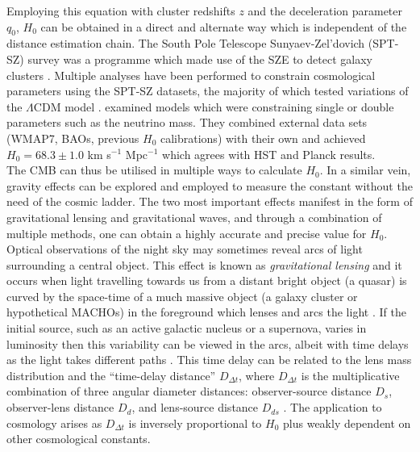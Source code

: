 \documentclass[12pt, onecolumn]{revtex4}    %
\begin{document}
Employing this equation with cluster redshifts $z$ and the deceleration parameter $q_0$, $H_0$ can be obtained in a direct and alternate way which is independent of the distance estimation chain. The South Pole Telescope Sunyaev-Zel'dovich (SPT-SZ) survey was a programme which made use of the SZE to detect galaxy clusters \citep{2009AIPC.1185..475C}. Multiple analyses have been performed to constrain cosmological parameters using the SPT-SZ datasets, the majority of which tested variations of the $\Lambda$CDM model \citep{2014ApJ...782...74H, 2016ApJ...832...95D}. \cite{2014ApJ...782...74H} examined models which were constraining single or double parameters such as the neutrino mass. They combined external data sets (WMAP7, BAOs, previous $H_0$ calibrations) with their own and achieved $H_0=68.3\pm1.0$ km s$^{-1}$ Mpc$^{-1}$ which agrees with HST and Planck results.\\


The CMB can thus be utilised in multiple ways to calculate $H_0$. In a similar vein, gravity effects can be explored and employed to measure the constant without the need of the cosmic ladder. The two most important effects manifest in the form of gravitational lensing and gravitational waves, and through a combination of multiple methods, one can obtain a highly accurate and precise value for $H_0$. \\

Optical observations of the night sky may sometimes reveal arcs of light surrounding a central object. This effect is known as \textit{gravitational lensing} and it occurs when light travelling towards us from a distant bright object (a quasar) is curved by the space-time of a much massive object (a galaxy cluster or hypothetical MACHOs) in the foreground which lenses and arcs the light \citep{carroll_astro}. If the initial source, such as an active galactic nucleus or a supernova, varies in luminosity then this variability can be viewed in the arcs, albeit with time delays as the light takes different paths \citep{suyu_2017}. This time delay can be related to the lens mass distribution and the ``time-delay distance'' $D_{\Delta t}$, where $D_{\Delta t}$ is the multiplicative combination of three angular diameter distances: observer-source distance $D_s$, observer-lens distance $D_d$, and lens-source distance $D_{ds}$ \citep{suyu_2017, 2018MNRAS.473..210S}. The application to cosmology arises as $D_{\Delta t}$ is inversely proportional to $H_0$ plus weakly dependent on other cosmological constants. \\
\end{document}
